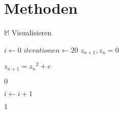 \EnableTitleSlide
\section{Methoden}





\begin{frame}{$\mathbb{M}$ Visualisieren}
    \begin{center}
        \begin{algorithmic}
            \State $i \gets 0$
            \State $iterationen \gets 20$
            \State $z_{n+1}, z_n = 0$
            
            \State $z_{n+1} = {z_n}^2 + c$

            \State \Return $0$
            \EndIf

            \State $i \gets i + 1$
            \EndWhile

            \State \Return $1$
            \EndFunction
        \end{algorithmic}
    \end{center}
\end{frame}

